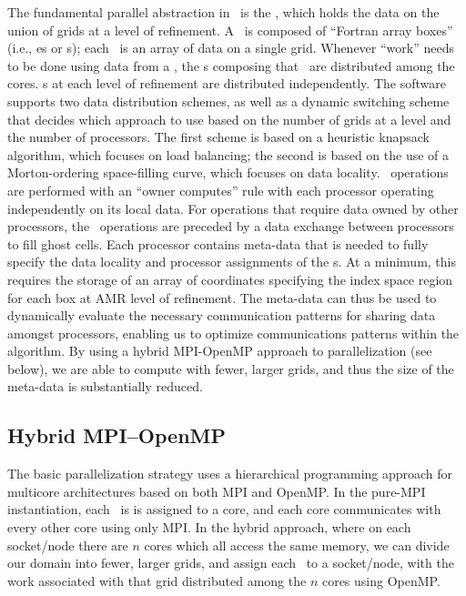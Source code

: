 The fundamental parallel abstraction in \BoxLib\ is the \MultiFab, which holds the data on the 
union of grids at a level of refinement.  A \MultiFab\ is composed of ``Fortran array boxes''
(i.e., \FArrayBox es or \Fab s); each \Fab\ is an array of data on a single grid. 
Whenever ``work'' needs to be done using data from a \MultiFab, the 
\Fab s composing that \MultiFab\ are distributed 
among the cores.  \Fab s at each level of refinement are distributed 
independently.  The software supports two data distribution schemes, as well as a 
dynamic switching scheme that decides which approach to use based on the number of 
grids at a level and the number of processors.  The first scheme is based on a 
heuristic knapsack algorithm, which focuses on load balancing; the second is based on 
the use of a Morton-ordering space-filling curve, which focuses on data locality. 
 \MultiFab\ operations are performed with an ``owner computes'' rule 
with each processor operating independently on its local data.  For operations that 
require data owned by other processors, the \MultiFab\ operations are preceded by a 
data exchange between processors to fill ghost cells.  Each processor contains 
meta-data that is needed 
to fully specify the data locality and processor assignments of the \Fab s. At a 
minimum, this requires the storage of an array of coordinates specifying the index space 
region for each box at AMR level of refinement.  The meta-data can thus be used to 
dynamically evaluate the necessary communication patterns for sharing data amongst 
processors, enabling us to optimize communications patterns within the algorithm.
By using a hybrid MPI-OpenMP approach to parallelization (see below), we are able to 
compute with fewer, larger grids, and thus the size of the meta-data is substantially 
reduced.

\subsection{Hybrid MPI--OpenMP}

The basic parallelization strategy uses a hierarchical programming approach for 
multicore architectures based on both MPI and OpenMP.  In the pure-MPI instantiation, 
each \Fab\ is is assigned to a core, and each core communicates 
with every other core using only MPI.  In the hybrid approach, where on each socket/node 
there are $n$ cores which all access the same memory, we can divide our domain into
fewer, larger grids, and assign each \Fab\ to a socket/node, 
with the work associated with that grid distributed among the $n$ 
cores using OpenMP.


